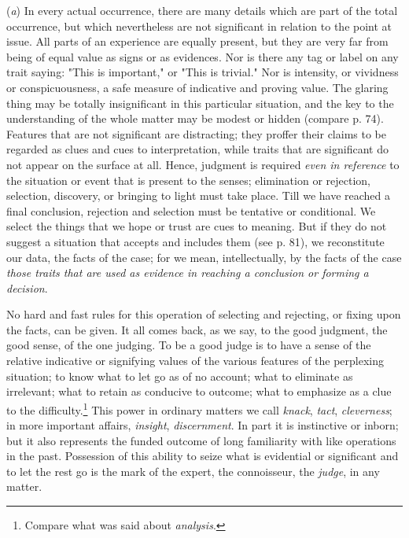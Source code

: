 \documentclass[letterpaper]{book}
\begin{document}
(\emph{a}) In every actual occurrence, there are many details which are
part of the total occurrence, but which nevertheless are not significant
in relation to the point at issue. All parts of an experience are
equally present, but they are very far from being of equal value as
signs or as evidences. Nor is there any tag or label on any trait
saying: "This is important," or "This is trivial." Nor is intensity, or
vividness or conspicuousness, a safe measure of indicative and proving
value. The glaring thing may be totally insignificant in this particular
situation, and the key to the understanding of the whole matter may be
modest or hidden (compare p. 74). Features that are not significant are
distracting; they proffer their claims to be regarded as clues and cues
to interpretation, while traits that are significant do not appear on
the surface at all. Hence, judgment is required \emph{even in reference}
to the situation or event that is present to the senses; elimination or
rejection, selection, discovery, or bringing to light must take
place.
Till we have reached a final conclusion, rejection and selection must be
tentative or conditional. We select the things that we hope or trust are
cues to meaning. But if they do not suggest a situation that accepts and
includes them (see p. 81), we reconstitute our data, the facts of the
case; for we mean, intellectually, by the facts of the case \emph{those
traits that are used as evidence in reaching a conclusion or forming a
decision}.


No hard and fast rules for this operation of selecting and rejecting, or
fixing upon the facts, can be given. It all comes back, as we say, to
the good judgment, the good sense, of the one judging. To be a good
judge is to have a sense of the relative indicative or signifying values
of the various features of the perplexing situation; to know what to let
go as of no account; what to eliminate as irrelevant; what to retain as
conducive to outcome; what to emphasize as a clue to the
difficulty.\footnote{ Compare what was said about \emph{analysis}. }
This power in ordinary matters we call \emph{knack}, \emph{tact},
\emph{cleverness}; in more important affairs, \emph{insight},
\emph{discernment}. In part it is instinctive or inborn; but it also
represents the funded outcome of long familiarity with like operations
in the past. Possession of this ability to seize what is evidential or
significant and to let the rest go is the mark of the expert, the
connoisseur, the \emph{judge}, in any matter.
\end{document}
